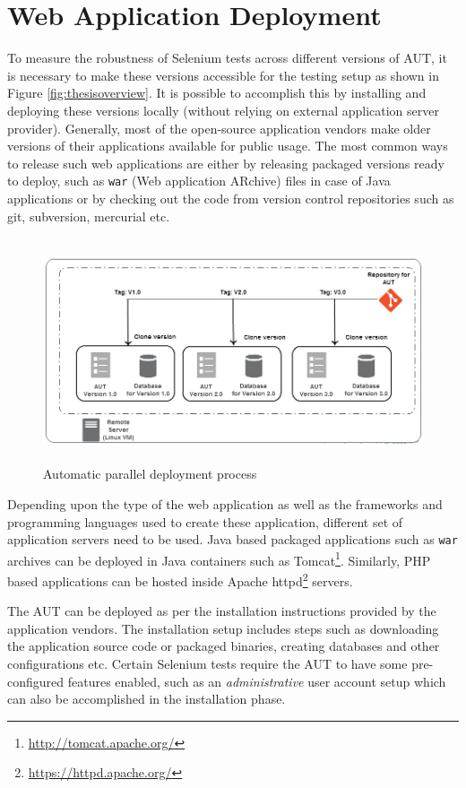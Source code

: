 \section{Web Application Deployment}
\label{sec:autoDeployment}
To measure the robustness of Selenium tests across different versions of AUT, it is necessary to make these versions accessible for the testing setup as shown in Figure \ref{fig:thesisoverview}. It is possible to accomplish this by installing and deploying these versions locally (without relying on external application server provider). Generally, most of the open-source application vendors make older versions of their applications available for public usage. The most common ways to release such web applications are either by releasing packaged versions ready to deploy, such as \texttt{war} (Web application ARchive) files in case of Java applications or by checking out the code from version control repositories such as git, subversion, mercurial etc.

\begin{figure}
\makeatletter 
\renewcommand{\thefigure}{\@arabic\c@figure}
\makeatother
    \centering
  \includegraphics[width=5.4in,height=2.6in]{./Figures/Deployment_Process_2.jpg}
  \caption{Automatic parallel deployment process}
  \label{fig:deployment} 
\end{figure}

Depending upon the type of the web application as well as the frameworks and programming languages used to create these application, different set of application servers need to be used. Java based packaged applications such as \texttt{war} archives can be deployed in Java containers such as Tomcat\footnote{\url{http://tomcat.apache.org/}}. Similarly, PHP based applications can be hosted inside Apache httpd\footnote{\url{https://httpd.apache.org/}} servers. 

The AUT can be deployed as per the installation instructions provided by the application vendors. The installation setup includes steps such as downloading the application source code or packaged binaries, creating databases and other configurations etc. Certain Selenium tests require the AUT to have some pre-configured features enabled, such as an \textit{administrative} user account setup which can also be accomplished in the installation phase. 

